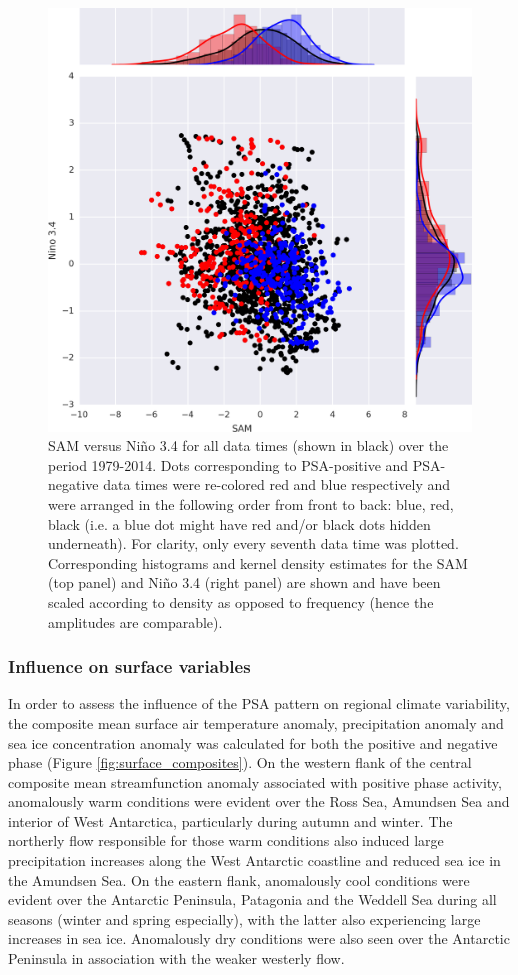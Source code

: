 \begin{figure}
\begin{center}
\includegraphics[width=0.7\columnwidth]{figures/psa/nino34-vs-sam_psa-phases_ERAInterim_surface_030day-runmean_native.png}
\caption{\label{fig:sam_v_enso}
SAM versus Ni\~{n}o 3.4 for all data times (shown in black) over the period 1979-2014. Dots corresponding to PSA-positive and PSA-negative data times were re-colored red and blue respectively and were arranged in the following order from front to back: blue, red, black (i.e. a blue dot might have red and/or black dots hidden underneath). For clarity, only every seventh data time was plotted. Corresponding histograms and kernel density estimates for the SAM (top panel) and Ni\~{n}o 3.4 (right panel) are shown and have been scaled according to density as opposed to frequency (hence the amplitudes are comparable).%
}
\end{center}
\end{figure}

\subsubsection{Influence on surface variables} 

In order to assess the influence of the PSA pattern on regional climate variability, the composite mean surface air temperature anomaly, precipitation anomaly and sea ice concentration anomaly was calculated for both the positive and negative phase (Figure \ref{fig:surface_composites}). On the western flank of the central composite mean streamfunction anomaly associated with positive phase activity, anomalously warm conditions were evident over the Ross Sea, Amundsen Sea and interior of West Antarctica, particularly during autumn and winter. The northerly flow responsible for those warm conditions also induced large precipitation increases along the West Antarctic coastline and reduced sea ice in the Amundsen Sea. On the eastern flank, anomalously cool conditions were evident over the Antarctic Peninsula, Patagonia and the Weddell Sea during all seasons (winter and spring especially), with the latter also experiencing large increases in sea ice. Anomalously dry conditions were also seen over the Antarctic Peninsula in association with the weaker westerly flow. 

